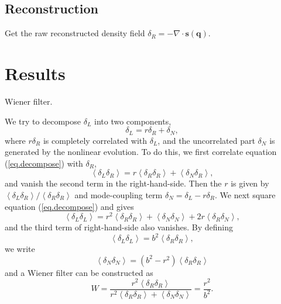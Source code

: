 \documentclass[aps,prd,twocolumn,superscriptaddress,amsfont,amssymb,amsmath,nofootinbib,showpacs,balancelastpage]{revtex4-1}
\newcommand{\bs}{\boldsymbol}
\begin{document}
\subsection{Reconstruction}
Get the raw reconstructed density field $\delta_R=-\nabla\cdot{\bs s}({\bs q})$.



\section{Results}\label{sec.results}

Wiener filter.

We try to decompose $\delta_L$ into two components,
\begin{equation}\label{eq.decompose}
    \delta_L=r\delta_R+\delta_N,
\end{equation}
where $r\delta_R$ is completely correlated with $\delta_L$, and the uncorrelated part $\delta_N$ is generated by the nonlinear evolution. To do this, we first correlate equation (\ref{eq.decompose}) with $\delta_R$,
\begin{equation}\label{eq.correlate}
    \left\langle\delta_L\delta_R\right\rangle
    =r\left\langle\delta_R\delta_R\right\rangle
    +\left\langle\delta_N\delta_R\right\rangle,
\end{equation}
and vanish the second term in the right-hand-side. Then the $r$ is given by $\left\langle\delta_L\delta_R\right\rangle / \left\langle\delta_R\delta_R\right\rangle$ and mode-coupling term $\delta_N=\delta_L-r\delta_R$. We next square equation (\ref{eq.decompose}) and gives
\begin{equation}\label{eq.square}
    \left\langle\delta_L\delta_L\right\rangle
    =r^2\left\langle\delta_R\delta_R\right\rangle
    +\left\langle\delta_N\delta_N\right\rangle
    +2r\left\langle\delta_R\delta_N\right\rangle,
\end{equation}
and the third term of right-hand-side also vanishes. By defining
\begin{equation}
    \left\langle\delta_L\delta_L\right\rangle
    =b^2\left\langle\delta_R\delta_R\right\rangle,
\end{equation}
we write
\begin{equation}
    \left\langle\delta_N\delta_N\right\rangle=(b^2-r^2)\left\langle\delta_R\delta_R\right\rangle
\end{equation}
and a Wiener filter can be constructed as
\begin{equation}
    W=\frac{r^2\left\langle\delta_R\delta_R\right\rangle}
    {r^2\left\langle\delta_R\delta_R\right\rangle+\left\langle\delta_N\delta_N\right\rangle}
    =\frac{r^2}{b^2}.
\end{equation}
\end{document}
